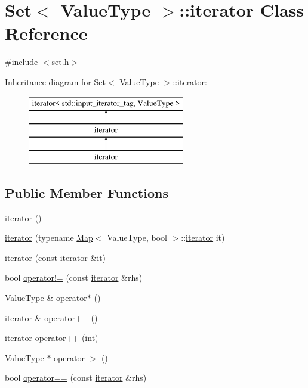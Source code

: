 \hypertarget{classSet_1_1iterator}{}\section{Set$<$ Value\+Type $>$\+:\+:iterator Class Reference}
\label{classSet_1_1iterator}


{\ttfamily \#include $<$set.\+h$>$}

Inheritance diagram for Set$<$ Value\+Type $>$\+:\+:iterator\+:\begin{figure}[H]
\begin{center}
\leavevmode
\includegraphics[height=3.000000cm]{classSet_1_1iterator}
\end{center}
\end{figure}
\subsection*{Public Member Functions}
\begin{DoxyCompactItemize}
\item 
\mbox{\hyperlink{classSet_1_1iterator_a67d652c2433cf9217ed2a1485092fdd1}{iterator}} ()
\item 
\mbox{\hyperlink{classSet_1_1iterator_a859c06bc3a8fc834adc01c80ca31c388}{iterator}} (typename \mbox{\hyperlink{classMap}{Map}}$<$ Value\+Type, bool $>$\+::\mbox{\hyperlink{classSet_1_1iterator}{iterator}} it)
\item 
\mbox{\hyperlink{classSet_1_1iterator_a698b7553261e7209d6c29fb55627dce4}{iterator}} (const \mbox{\hyperlink{classSet_1_1iterator}{iterator}} \&it)
\item 
bool \mbox{\hyperlink{classSet_1_1iterator_ae1983f2cb0df1f0cbe77ac29590e2e2b}{operator!=}} (const \mbox{\hyperlink{classSet_1_1iterator}{iterator}} \&rhs)
\item 
Value\+Type \& \mbox{\hyperlink{classSet_1_1iterator_ae7b3826e734ec2f7c79f5196fad83989}{operator$\ast$}} ()
\item 
\mbox{\hyperlink{classSet_1_1iterator}{iterator}} \& \mbox{\hyperlink{classSet_1_1iterator_af1b1c7856a59f34c7d3570f946a2ff00}{operator++}} ()
\item 
\mbox{\hyperlink{classSet_1_1iterator}{iterator}} \mbox{\hyperlink{classSet_1_1iterator_a538d230f8b52d2bc0950e26ce74ec239}{operator++}} (int)
\item 
Value\+Type $\ast$ \mbox{\hyperlink{classSet_1_1iterator_a5ba42337ec7bae549bb135838933b0ea}{operator-\/$>$}} ()
\item 
bool \mbox{\hyperlink{classSet_1_1iterator_a798956e7a65ef16c891d129b3ced0f9e}{operator==}} (const \mbox{\hyperlink{classSet_1_1iterator}{iterator}} \&rhs)
\end{DoxyCompactItemize}


